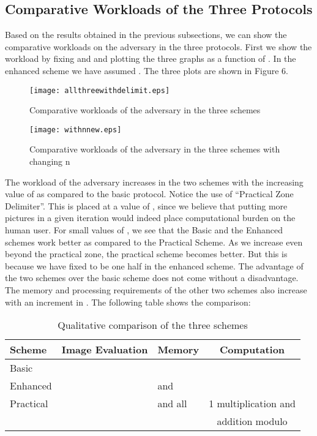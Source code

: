 \documentclass{llncs}
\newcommand{\tick}{\ding{52}}
\newcommand{\cross}{\ding{56}}
\begin{document}
\subsection{Comparative Workloads of the Three Protocols}
Based on the results obtained in the previous subsections, we can show the comparative workloads on the adversary in the three protocols. First we show the workload by fixing  and  and plotting the three graphs as a function of . In the enhanced scheme we have assumed . The three plots are shown in Figure 6.
\begin{figure}[ht]
\centerline{\texttt{[image: allthreewithdelimit.eps]}}
\caption{Comparative workloads of the adversary in the three schemes}
\label{fig2}
\end{figure}


\begin{figure}[ht]
\centerline{\texttt{[image: withnnew.eps]}}
\caption{Comparative workloads of the adversary in the three schemes with changing n}
\label{fig3}
\end{figure}


The workload of the adversary increases in the two schemes with the increasing value of  as compared to the basic protocol. Notice the use of ``Practical Zone Delimiter''. This is placed at a value of , since we believe that putting more pictures in a given iteration would indeed place computational burden on the human user. For small values of , we see that the Basic and the Enhanced schemes work better as compared to the Practical Scheme. As we increase  even beyond the practical zone, the practical scheme becomes better. But this is because we have fixed  to be one half  in the enhanced scheme. The advantage of the two schemes over the basic scheme does not come without a disadvantage. The memory and processing requirements of the other two schemes also increase with an increment in . The following table shows the comparison:

\begin{table}
\caption{Qualitative comparison of the three schemes}
\begin{center}

\begin{tabular}{|l|c|l|c|}
\hline
Scheme&Image Evaluation&Memory&Computation\\
\hline
Basic& \tick &  & \cross\\
Enhanced& \tick &  and & \cross\\
Practical& \tick &  and  all & 1 multiplication and \\ &&& addition modulo \\
\hline
\end{tabular}

\end{center}
\end{table}
\end{document}
